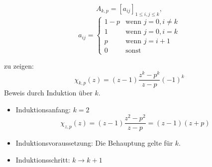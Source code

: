 \begin{flushenum}
\item
  \[ A_{k,p} = \left[a_{ij}\right]_{1\leq i,j\leq k}, \]
  \[ a_{ij} = \begin{cases} 1-p &\text{wenn~} j = 0, i \not= k \\
                              1 &\text{wenn~} j = 0, i = k \\
                              p &\text{wenn~} j = i + 1 \\
                              0 &\text{sonst} \end{cases} \]

  zu zeigen: \[ \chi_{k,p}(z) = (z - 1) \frac{z^{k}-p^{k}}{z-p}(-1)^{k} \]
  Beweis durch Induktion über $k$.
  \begin{itemize}
    \item Induktionsanfang: $k = 2$
      \[ \chi_{z,p}(z) = (z - 1) \frac{z^{2}-p^{2}}{z-p} = (z-1)(z+p) \]
    \item Induktionsvoraussetzung: Die Behauptung gelte für $k$.
    \item Induktionsschritt: $k \rightarrow k + 1$


\end{itemize}
\end{flushenum}

